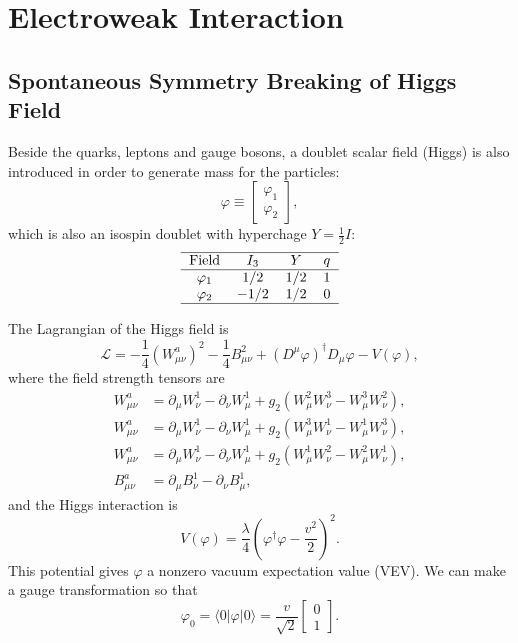 \section{Electroweak Interaction}

\subsection{Spontaneous Symmetry Breaking of Higgs Field}
Beside the quarks, leptons and gauge bosons, a doublet scalar field (Higgs) is also introduced in order to generate mass for the particles:
\begin{equation}
	\varphi \equiv \left[\begin{array}{c}
		\varphi_1 \\ \varphi_2
	\end{array} \right],
\end{equation}
which is also an isospin doublet with hyperchage $Y=\frac{1}{2}I$:
\begin{equation}
	\begin{tabular}{c c c c}
		\hline 
		Field & $I_3$ & $Y$ & $q$\\ \hline
		$\varphi_1$ & $1/2$ & $1/2$ & $1$ \\ 
		$\varphi_2$ & $-1/2$ & $1/2$ & $0$ \\  
		\hline 
	\end{tabular}
\end{equation}

The Lagrangian of the Higgs field is 
\begin{equation}\label{eq:SM-Higgs-L1}
	\mathcal L = -\frac{1}{4}(W^a_{\mu\nu})^2 - \frac{1}{4}B_{\mu\nu}^2 +(D^\mu \varphi)^\dagger D_\mu \varphi- V(\varphi),
\end{equation}
where the field strength tensors are
\begin{equation}
\begin{aligned}
	W^a_{\mu\nu} &= \partial_\mu W_\nu^1 - \partial_\nu W^1_\mu + g_2 (W_\mu^2 W_\nu^3 - W_\mu^3 W_\nu^2), \\
	W^a_{\mu\nu} &= \partial_\mu W_\nu^1 - \partial_\nu W^1_\mu + g_2 (W_\mu^3 W_\nu^1 - W_\mu^1 W_\nu^3), \\
	W^a_{\mu\nu} &= \partial_\mu W_\nu^1 - \partial_\nu W^1_\mu + g_2 (W_\mu^1 W_\nu^2 - W_\mu^2 W_\nu^1), \\
	B^a_{\mu\nu} &= \partial_\mu B_\nu^1 - \partial_\nu B^1_\mu,
\end{aligned}
\end{equation}
and the Higgs interaction is
\begin{equation}
	V(\varphi) = \frac{\lambda}{4} \left(\varphi^\dagger \varphi - \frac{v^2}{2} \right)^2.
\end{equation}
This potential gives $\varphi$ a nonzero vacuum expectation value (VEV). 
We can make a gauge transformation so that
\begin{equation}
	\varphi_0 = \langle 0| \varphi |0\rangle = \frac{v}{\sqrt 2} \left[\begin{array}{c}
		0 \\ 1	\end{array} \right].
\end{equation}


